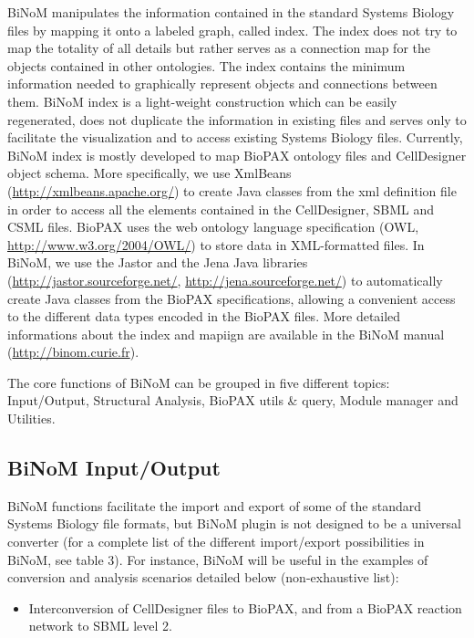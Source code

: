 \documentclass[10pt]{bmc_article}
\newenvironment{bmcformat}{\baselineskip20pt\sloppy\setboolean{publ}{false}}{\baselineskip20pt\sloppy}
\begin{document}
\begin{bmcformat}
BiNoM manipulates the information contained in the standard Systems Biology
files by mapping it onto a labeled graph, called index. The index does not try
to map the totality of all details but rather serves as a connection map for the
objects contained in other ontologies. The index contains the minimum
information needed to graphically represent objects and connections between
them. BiNoM index is a light-weight construction which can be easily
regenerated, does not duplicate the information in existing files and serves
only to facilitate the visualization and to access existing Systems Biology
files. Currently, BiNoM index is mostly developed to map BioPAX ontology files
and CellDesigner object schema. More specifically, we use XmlBeans
(\url{http://xmlbeans.apache.org/}) to create Java classes from the xml definition file in
order to access all the elements contained in the CellDesigner, SBML and CSML files.
BioPAX uses the web ontology language specification (OWL,
\url{http://www.w3.org/2004/OWL/}) to store data in XML-formatted files. In
BiNoM, we use the Jastor and the Jena Java libraries
(\url{http://jastor.sourceforge.net/}, \url{http://jena.sourceforge.net/}) to
automatically create Java classes from the BioPAX specifications, allowing a
convenient access to the different data types encoded in the BioPAX files. More
detailed informations about the index and mapiign are available in the BiNoM
manual (\url{http://binom.curie.fr}).

The core functions of BiNoM can be grouped in five different topics: Input/Output,
Structural Analysis, BioPAX utils \& query, Module manager and Utilities.

\subsection*{BiNoM Input/Output}

BiNoM functions facilitate the import and export of some of the standard Systems
Biology file formats, but BiNoM plugin is not designed to be a universal
converter (for a complete list of the different import/export possibilities in
BiNoM, see table 3).
For instance, BiNoM will be useful in the examples of conversion and analysis
scenarios detailed below (non-exhaustive list):

\begin{itemize}

\item Interconversion of CellDesigner files to BioPAX, and from a BioPAX
reaction network to SBML level 2.


\end{itemize}
\end{bmcformat}
\end{document}
